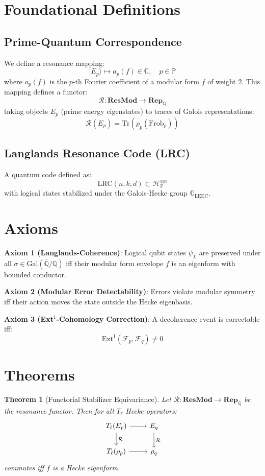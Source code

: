 \documentclass[12]{amsart}
\theoremstyle{plain}
\newtheorem{theorem}{Theorem}[section]
\begin{document}
\section{Foundational Definitions}

\subsection{Prime-Quantum Correspondence}
We define a resonance mapping:
\[
|E_p\rangle \longmapsto a_p(f) \in \mathbb{C}, \quad p \in \mathbb{P}
\]
where $a_p(f)$ is the $p$-th Fourier coefficient of a modular form $f$ of weight 2. This mapping defines a functor:
\[
\mathcal{R}: \textbf{ResMod} \to \textbf{Rep}_{\mathbb{Q}}
\]
taking objects $E_p$ (prime energy eigenstates) to traces of Galois representations:
\[
\mathcal{R}(E_p) = \text{Tr}(\rho_p(\text{Frob}_p))
\]

\subsection{Langlands Resonance Code (LRC)}
A quantum code defined as:
\[
\text{LRC}(n,k,d) \subset \mathcal{H}_{\mathbb{P}}^{\otimes n}
\]
with logical states stabilized under the Galois-Hecke group $\mathbb{G}_\text{LEEC}$.

\section{Axioms}

\textbf{Axiom 1 (Langlands-Coherence)}:  
Logical qubit states $\psi_L$ are preserved under all $\sigma \in \text{Gal}(\overline{\mathbb{Q}}/\mathbb{Q})$ iff their modular form envelope $f$ is an eigenform with bounded conductor.

\textbf{Axiom 2 (Modular Error Detectability)}:  
Errors violate modular symmetry iff their action moves the state outside the Hecke eigenbasis.

\textbf{Axiom 3 (Ext$^1$-Cohomology Correction)}:  
A decoherence event is correctable iff:
\[
\text{Ext}^1(\mathcal{F}_p, \mathcal{F}_q) \neq 0
\]

\section{Theorems}

\begin{theorem}[Functorial Stabilizer Equivariance]
Let $\mathcal{R}: \textbf{ResMod} \to \textbf{Rep}_{\mathbb{Q}}$ be the resonance functor. Then for all $T_\ell$ Hecke operators:
\[
\begin{tikzcd}
T_\ell(E_p) \arrow{r} \arrow{d}{\mathcal{R}} & E_q \arrow{d}{\mathcal{R}} \\
T_\ell(\rho_p) \arrow{r} & \rho_q
\end{tikzcd}
\]
commutes iff $f$ is a Hecke eigenform.
\end{theorem}
\end{document}
